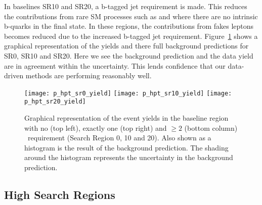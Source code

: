 In baselines SR10 and SR20, a b-tagged jet requirement is made. This reduces
the contributions from rare SM processes such as \WZ and \qqWW where
there are no intrinsic b-quarks in the final state. In these regions, the
contributions from fakes leptons becomes reduced due to the increased b-tagged
jet requirement. Figure~\ref{fig:results_yield_hpt_bl} shows a graphical
representation of the yields and there full background predictions for SR0,
SR10 and SR20. Here we see the background prediction and the data yield are in
agreement within the uncertainty. This lends confidence that our data-driven
methods are performing reasonably well.

\begin{figure}[h]
\begin{center}
\texttt{[image: p\_hpt\_sr0\_yield]}
\texttt{[image: p\_hpt\_sr10\_yield]}
\texttt{[image: p\_hpt\_sr20\_yield]}
\caption[Graphical representation of the event yields in the \hpt baseline regions]
{\label{fig:results_yield_hpt_bl}
Graphical representation of the event yields in the \hpt baseline region
with no (top left), exactly one (top right) and $\geq 2$ (bottom column)
\nbtags~requirement (Search Region 0, 10 and 20). Also shown as a histogram
is the result of the background prediction. The shading around the histogram
represents the uncertainty in the background prediction.
}
\end{center}
\end{figure}
\clearpage
\subsection{High \pt Search Regions}
\label {sec:results_hpt_sr}


